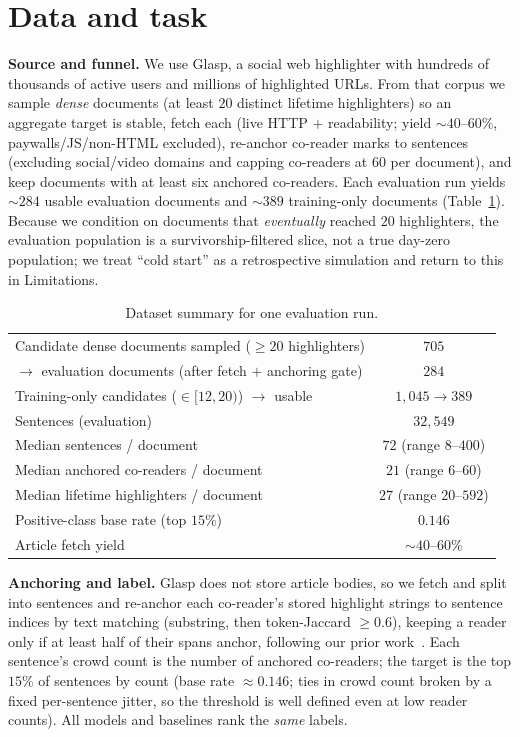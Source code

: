 \documentclass[11pt]{article}
\begin{document}
\section{Data and task}
\textbf{Source and funnel.} We use Glasp, a social web highlighter with hundreds of thousands of
active users and millions of highlighted URLs. From that corpus we sample \emph{dense}
documents (at least $20$ distinct lifetime highlighters) so an aggregate target is stable, fetch
each (live HTTP $+$ readability; yield $\sim$$40$--$60\%$, paywalls/JS/non-HTML excluded),
re-anchor co-reader marks to sentences (excluding social/video domains and capping co-readers at
$60$ per document), and keep documents with at least six anchored co-readers. Each evaluation
run yields $\sim$$284$ usable evaluation documents and $\sim$$389$ training-only documents
(Table~\ref{tab:data}). Because we condition on documents that \emph{eventually} reached $20$
highlighters, the evaluation population is a survivorship-filtered slice, not a true day-zero
population; we treat ``cold start'' as a retrospective simulation and return to this in
Limitations.

\begin{table}[t]
\centering
\caption{Dataset summary for one evaluation run.}
\label{tab:data}
\begin{tabular}{lc}
\toprule
Candidate dense documents sampled ($\geq 20$ highlighters) & $705$ \\
\quad $\to$ evaluation documents (after fetch $+$ anchoring gate) & $284$ \\
Training-only candidates ($\in[12,20)$) $\to$ usable & $1{,}045 \to 389$ \\
Sentences (evaluation) & $32{,}549$ \\
Median sentences / document & $72$ (range $8$--$400$) \\
Median anchored co-readers / document & $21$ (range $6$--$60$) \\
Median lifetime highlighters / document & $27$ (range $20$--$592$) \\
Positive-class base rate (top $15\%$) & $0.146$ \\
Article fetch yield & $\sim$$40$--$60\%$ \\
\bottomrule
\end{tabular}
\end{table}

\textbf{Anchoring and label.} Glasp does not store article bodies, so we fetch and split into
sentences and re-anchor each co-reader's stored highlight strings to sentence indices by text
matching (substring, then token-Jaccard $\geq 0.6$), keeping a reader only if at least half of
their spans anchor, following our prior work~\cite{nakayashiki2026salience}. Each sentence's
crowd count is the number of anchored co-readers; the target is the top $15\%$ of sentences by
count (base rate $\approx 0.146$; ties in crowd count broken by a fixed per-sentence jitter, so
the threshold is well defined even at low reader counts). All models and baselines rank the
\emph{same} labels.
\end{document}
